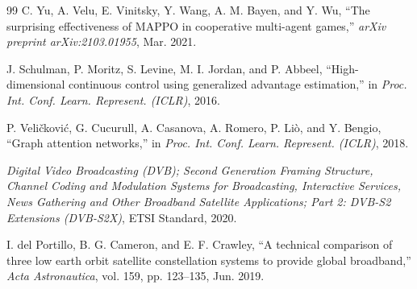 \documentclass[journal]{IEEEtran}
\newcommand{\revbegin}[1]{\color{revisionblue}\ignorespaces}
\newcommand{\revend}[1]{\color{black}\ignorespaces}
\begin{document}
\begin{thebibliography}{99}
 C. Yu, A. Velu, E. Vinitsky, Y. Wang, A. M. Bayen, and Y. Wu, ``The surprising effectiveness of MAPPO in cooperative multi-agent games,'' \textit{arXiv preprint arXiv:2103.01955}, Mar. 2021.

\revbegin{} J. Schulman, P. Moritz, S. Levine, M. I. Jordan, and P. Abbeel, ``High-dimensional continuous control using generalized advantage estimation,'' in \textit{Proc. Int. Conf. Learn. Represent. (ICLR)}, 2016.\revend{}

 P. Veli\v{c}kovi\'c, G. Cucurull, A. Casanova, A. Romero, P. Li\`o, and Y. Bengio, ``Graph attention networks,'' in \textit{Proc. Int. Conf. Learn. Represent. (ICLR)}, 2018.

 \textit{Digital Video Broadcasting (DVB); Second Generation Framing Structure, Channel Coding and Modulation Systems for Broadcasting, Interactive Services, News Gathering and Other Broadband Satellite Applications; Part 2: DVB-S2 Extensions (DVB-S2X)}, ETSI Standard, 2020.

 I. del Portillo, B. G. Cameron, and E. F. Crawley, ``A technical comparison of three low earth orbit satellite constellation systems to provide global broadband,'' \textit{Acta Astronautica}, vol. 159, pp. 123--135, Jun. 2019.
\end{thebibliography}
\end{document}
